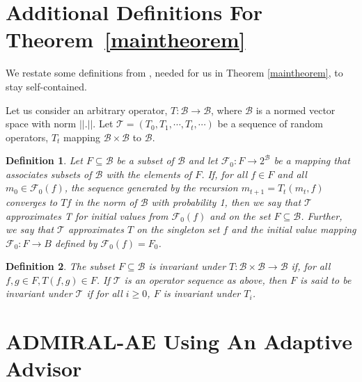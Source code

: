 \documentclass[jair, twoside,11pt,theapa]{article}
\newtheorem{defn}{Definition}
\begin{document}
\section{Additional Definitions For Theorem~\ref{maintheorem}}\label{appendix:definitions}


We restate some definitions from \cite{szepesvari1999unified}, needed for us in Theorem \ref{maintheorem}, to stay self-contained. 


Let us consider an arbitrary operator, $T: \mathcal{B} \xrightarrow{} \mathcal{B}$, where $\mathcal{B}$ is a normed vector space with norm $||.||$. Let $\mathcal{T} = (T_0, T_1, \cdots, T_t, \cdots)$ be a sequence of random operators, $T_t$ mapping $\mathcal{B} \times \mathcal{B}$ to $\mathcal{B}$. 


\begin{defn}
Let $F \subseteq \mathcal{B} $ be a subset of $\mathcal{B}$ and let $\mathcal{F}_0: F \xrightarrow{} 2^{\mathcal{B}}$ be a mapping that associates subsets of $\mathcal{B}$ with the elements of $F$. If, for all $f \in F$ and all $m_0 \in \mathcal{F}_0(f)$, the sequence generated by the recursion $m_{t+1} = T_t(m_t, f)$ converges to $Tf$ in the norm of $\mathcal{B}$ with probability 1, then we say that $\mathcal{T}$ approximates T for initial values from $\mathcal{F}_0(f)$ and on the set $F \subseteq \mathcal{B}$. Further, we say that $\mathcal{T}$ approximates $T$ on the singleton set ${f}$ and the initial value mapping $\mathcal{F}_0: F \xrightarrow{} B$ defined by $\mathcal{F}_0(f) = F_0$.

\end{defn}

\begin{defn}
The subset $F \subseteq \mathcal{B}$ is invariant under $T: \mathcal{B} \times \mathcal{B} \xrightarrow{} \mathcal{B}$ if, for all $f,g \in F, T(f,g) \in F$. If $\mathcal{T}$ is an operator sequence as above, then $F$ is said to be invariant under $\mathcal{T}$ if for all $i \geq 0$, $F$ is invariant under $T_i$. 
\end{defn}
















\section{ADMIRAL-AE Using An Adaptive Advisor}\label{sec:adaptive}
\end{document}
